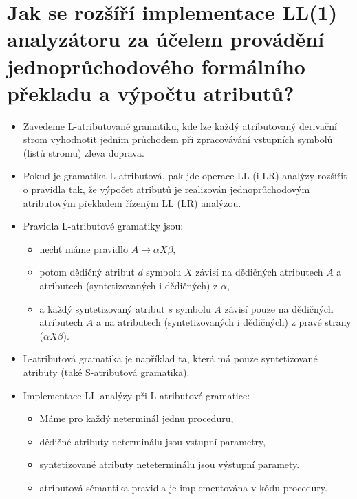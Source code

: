\documentclass{article}
\begin{document}
\section{Jak se rozšíří implementace LL(1) analyzátoru za účelem provádění jednoprůchodového formálního překladu a výpočtu atributů?}
\begin{itemize}
    \item Zavedeme L-atributované gramatiku, kde lze každý atributovaný derivační strom vyhodnotit jedním průchodem při zpracovávání vstupních symbolů (listů stromu) zleva doprava.
    
    \item Pokud je gramatika L-atributová, pak jde operace LL (i LR) analýzy rozšířit o pravidla tak, že výpočet atributů je realizován jednoprůchodovým atributovým překladem řízeným LL (LR) analýzou.
    
    \item Pravidla L-atributové gramatiky jsou:
    \begin{itemize}
        \item nechť máme pravidlo $ A \rightarrow \alpha X \beta $,
        \item potom dědičný atribut $d$ symbolu $X$ závisí na dědičných atributech $A$ a atributech (syntetizovaných i dědičných) z $\alpha$,
        \item a každý syntetizovaný atribut $s$ symbolu $A$ závisí pouze na dědičných atributech $A$ a na atributech (syntetizovaných i dědičných) z pravé strany ($\alpha X \beta$).
    \end{itemize}
    
    \item L-atributová gramatika je například ta, která má pouze syntetizované atributy (také S-atributová gramatika).
    
    \item \textcolor{myPink}{Implementace LL analýzy při L-atributové gramatice:}
    \begin{itemize}
        \item Máme pro každý neterminál jednu proceduru,
        \item dědičné atributy neterminálu jsou vstupní parametry,
        \item syntetizované atributy neteterminálu jsou výstupní paramety.
        \item atributová sémantika pravidla je implementována v kódu procedury. 
    \end{itemize}
\end{itemize}
\newpage
\end{document}
